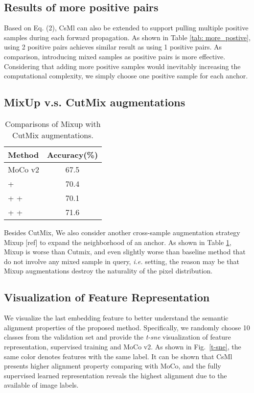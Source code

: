 \documentclass[10pt,twocolumn,letterpaper]{article}
\begin{document}
\subsection{{Results of more positive pairs}}
{Based on Eq. (2), CsMl can also be extended to support pulling multiple positive samples during each forward propagation. 
As shown in Table \ref{tab: more_postive}, using 2 positive pairs achieves similar result as using 1 positive pairs. As comparison, introducing mixed samples as positive pairs is more effective. Considering  that adding more positive samples would inevitably increasing the computational complexity, we simply choose one positive sample for each anchor. 
}

\subsection{MixUp v.s. CutMix augmentations}
\begin{table}[]
\centering
\caption{Comparisons of Mixup with CutMix augmentations.}

\vspace{0.01in}
\begin{tabular}{lc}
\toprule
Method                                            & Accuracy(\%)  \\
\midrule
MoCo v2                                             & 67.5         \\
 +                                        & 70.4        \\
 +  +           & 70.1        \\
 +  +          & 71.6        \\

\bottomrule
\end{tabular}
\label{tab: cutmix_mixup}
\end{table}

Besides CutMix, We also consider another cross-sample augmentation strategy Mixup [ref] to expand the neighborhood of an anchor. As shown in Table \ref{tab: cutmix_mixup}, Mixup is worse than Cutmix, and even slightly worse than baseline method that do not involve any mixed sample in query, \emph{i.e.}  setting, the reason may be that Mixup augmentations destroy the naturality of the pixel distribution. 

\subsection{Visualization of Feature Representation} 
We visualize the last embedding feature to better understand the semantic alignment properties of the proposed method. Specifically, we randomly choose 10 classes from the validation set and provide the \textit{t-sne} visualization of feature representation, supervised training and MoCo v2. As shown in Fig.~\ref{t-sne}, the same color denotes features with the same label. It can be shown that CsMl presents higher alignment property comparing with MoCo, and the fully supervised learned representation reveals the highest alignment due to the available of image labels.
\end{document}
